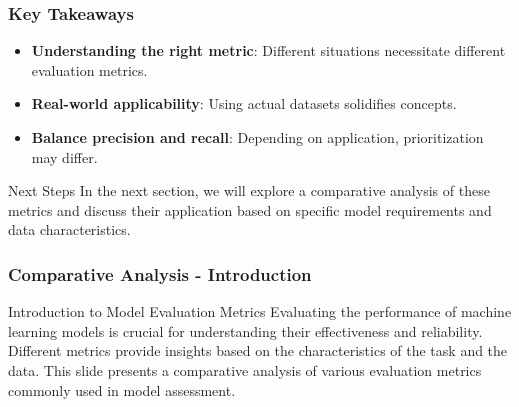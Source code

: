 \documentclass[aspectratio=169]{beamer}
\begin{document}
\begin{frame}[fragile]
    \frametitle{Key Takeaways}
    \begin{itemize}
        \item \textbf{Understanding the right metric}: Different situations necessitate different evaluation metrics.
        \item \textbf{Real-world applicability}: Using actual datasets solidifies concepts.
        \item \textbf{Balance precision and recall}: Depending on application, prioritization may differ.
    \end{itemize}
    \begin{block}{Next Steps}
        In the next section, we will explore a comparative analysis of these metrics and discuss their application based on specific model requirements and data characteristics.
    \end{block}
\end{frame}

\begin{frame}[fragile]
    \frametitle{Comparative Analysis - Introduction}
    \begin{block}{Introduction to Model Evaluation Metrics}
        Evaluating the performance of machine learning models is crucial for understanding their effectiveness and reliability. Different metrics provide insights based on the characteristics of the task and the data. 
        This slide presents a comparative analysis of various evaluation metrics commonly used in model assessment.
    \end{block}
\end{frame}
\end{document}

